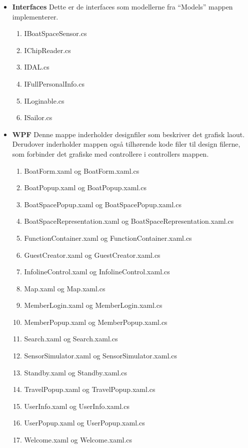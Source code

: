 \begin{itemize}
	\item \textbf{Interfaces} Dette er de interfaces som modellerne fra \enquote{Models} mappen implementerer.
		\begin{enumerate}
			\item IBoatSpaceSensor.cs
			\item IChipReader.cs
			\item IDAL.cs
			\item IFullPersonalInfo.cs
			\item ILoginable.cs
			\item ISailor.cs
		\end{enumerate}
\end{itemize}

\begin{itemize}
	\item \textbf{WPF} Denne mappe inderholder designfiler som beskriver det grafisk laout. Derudover inderholder mappen også tilhørende kode filer til design filerne, som forbinder det grafiske med controllere i controllers mappen.
		\begin{enumerate}
			\item BoatForm.xaml og BoatForm.xaml.cs
			\item BoatPopup.xaml og BoatPopup.xaml.cs
			\item BoatSpacePopup.xaml og BoatSpacePopup.xaml.cs
			\item BoatSpaceRepresentation.xaml og BoatSpaceRepresentation.xaml.cs
			\item FunctionContainer.xaml og FunctionContainer.xaml.cs
			\item GuestCreator.xaml og GuestCreator.xaml.cs
			\item InfolineControl.xaml og InfolineControl.xaml.cs
			\item Map.xaml og Map.xaml.cs
			\item MemberLogin.xaml og MemberLogin.xaml.cs
			\item MemberPopup.xaml og MemberPopup.xaml.cs
			\item Search.xaml og Search.xaml.cs
			\item SensorSimulator.xaml og SensorSimulator.xaml.cs
			\item Standby.xaml og Standby.xaml.cs
			\item TravelPopup.xaml og TravelPopup.xaml.cs
			\item UserInfo.xaml og UserInfo.xaml.cs
			\item UserPopup.xaml og UserPopup.xaml.cs
			\item Welcome.xaml og Welcome.xaml.cs
		\end{enumerate}
\end{itemize}